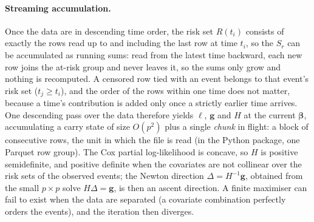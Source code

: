 \documentclass[11pt,a4paper]{article}
\begin{document}
\paragraph{Streaming accumulation.} Once the data are in descending time
order, the risk set $R(t_i)$ consists of exactly the rows read up to and
including the last row at time $t_i$, so the $S_r$ can be accumulated as
running sums: read from the latest time backward, each new row joins the
at-risk group and never leaves it, so the sums only grow and nothing is
recomputed. A censored row tied with an event belongs to that event's risk set
($t_j \ge t_i$), and the order of the rows within one time does not matter,
because a time's contribution is added only once a strictly earlier time
arrives. One descending pass over the data therefore yields $\ell$,
$\mathbf{g}$ and $H$ at the current $\boldsymbol\beta$, accumulating a carry
state of size $O(p^2)$ plus a single \emph{chunk} in flight: a block of
consecutive rows, the unit in which the file is read (in the Python package,
one Parquet row group). The Cox partial log-likelihood is concave, so $H$ is
positive semidefinite, and positive definite when the covariates are not
collinear over the risk sets of the observed events; the Newton direction
$\Delta = H^{-1}\mathbf{g}$, obtained from the small $p \times p$ solve
$H\Delta = \mathbf{g}$, is then an ascent direction. A finite maximiser can
fail to exist when the data are separated (a covariate combination perfectly
orders the events), and the iteration then diverges.
\end{document}
